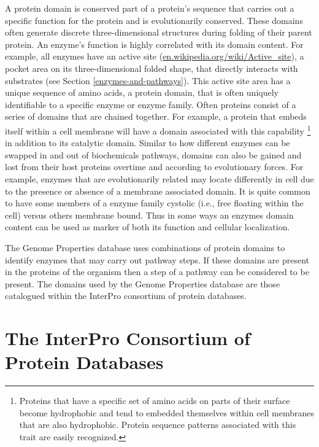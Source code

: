 A protein domain is conserved part of a protein's sequence that carries out a specific function for the protein and is evolutionarily conserved. These domains often generate discrete three-dimensional structures during folding of their parent protein. An enzyme's function is highly correlated with its domain content. For example, all enzymes have an active site (\href{en.wikipedia.org/wiki/Active\_site}{en.wikipedia.org/wiki/Active\_site}), a pocket area on its three-dimensional folded shape, that directly interacts with substrates (see Section \ref{enzymes-and-pathways}). This active site area has a unique sequence of amino acids, a protein domain, that is often uniquely identifiable to a specific enzyme or enzyme family. Often proteins consist of a series of domains that are chained together. For example, a protein that embeds itself within a cell membrane will have a domain associated with this capability \footnote{Proteins that have a specific set of amino acids on parts of their surface become hydrophobic and tend to embedded themselves within cell membranes that are also hydrophobic. Protein sequence patterns associated with this trait are easily recognized.} in addition to its catalytic domain. Similar to how different enzymes can be swapped in and out of biochemicals pathways, domains can also be gained and lost from their host proteins overtime and according to evolutionary forces. For example, enzymes that are evolutionarily related may locate differently in cell due to the presence or absence of a membrane associated domain. It is quite common to have some members of a enzyme family cystolic (i.e., free floating within the cell) versus others membrane bound. Thus in some ways an enzymes domain content can be used as marker of both its function and cellular localization.

The Genome Properties database uses combinations of protein domains to identify enzymes that may carry out pathway steps. If these domains are present in the proteins of the organism then a step of a pathway can be considered to be present. The domains used by the Genome Properties database are those catalogued within the InterPro consortium of protein databases.

\section{The InterPro Consortium of Protein Databases}

